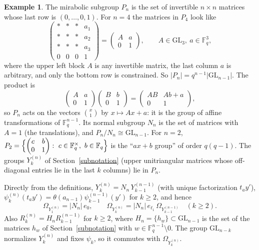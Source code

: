 \documentclass[11pt, letterpaper]{amsart}
\theoremstyle{definition}
\newtheorem{example}{Example}
\theoremstyle{remark}
\newcommand{\FF}{\mathbb{F}}
\newcommand{\GL}{\mathrm{GL}}
\begin{document}
\begin{example}\label{exmirab}
The mirabolic subgroup $P_n$ is the set of invertible $n\times n$ matrices whose last row is $(0,\dots,0,1)$. For $n=4$ the matrices in $P_4$ look like
\[
\left(\begin{array}{ccc|c}
\ast&\ast&\ast&a_1\\
\ast&\ast&\ast&a_2\\
\ast&\ast&\ast&a_3\\\hline
0&0&0&1
\end{array}\right)
=\begin{pmatrix}A&a\\0&1\end{pmatrix},\qquad A\in\GL_3,\ a\in\FF_q^3,
\]
where the upper left block $A$ is any invertible matrix, the last column $a$ is arbitrary, and only the bottom row is constrained. So $|P_n|=q^{n-1}|\GL_{n-1}|$. The product is
\[
\begin{pmatrix}A&a\\0&1\end{pmatrix}\begin{pmatrix}B&b\\0&1\end{pmatrix}=\begin{pmatrix}AB&Ab+a\\0&1\end{pmatrix},
\]
so $P_n$ acts on the vectors $\binom{x}{1}$ by $x\mapsto Ax+a$: it is the group of affine transformations of $\FF_q^{n-1}$. Its normal subgroup $N_n$ is the set of matrices with $A=1$ (the translations), and $P_n/N_n\cong\GL_{n-1}$. For $n=2$,
$P_2=\Bigl\{\begin{pmatrix}c&b\\0&1\end{pmatrix}:\ c\in\FF_q^\times,\ b\in\FF_q\Bigr\}$ is the ``$ax+b$ group'' of order $q(q-1)$. The groups $Y^{(n)}_k$ of Section~\ref{subnotation} (upper unitriangular matrices whose off-diagonal entries lie in the last $k$ columns) lie in $P_n$.
\end{example}

Directly from the definitions, $Y^{(n)}_k=N_n\,Y^{(n-1)}_{k-1}$ (with unique factorization $t_ay'$), $\psi^{(n)}_k(t_ay')=\theta(a_{n-1})\psi^{(n-1)}_{k-1}(y')$ for $k\ge2$, and hence
\[
\Omega_{Y^{(n)}_1}=|N_n|\,e_0,\qquad \Omega_{Y_k^{(n)}}=|N_n|\,e_{\ell_1}\,\Omega_{Y_{k-1}^{(n-1)}}\quad(k\ge2).
\]
Also $R^{(n)}_k=H_nR^{(n-1)}_{k-1}$ for $k\ge2$, where $H_n=\{h_w\}\subset\GL_{n-1}$ is the set of the matrices $h_w$ of Section~\ref{subnotation} with $w\in\FF_q^{n-1}\setminus0$. The group $\GL_{n-k}$ normalizes $Y_k^{(n)}$ and fixes $\psi_k$, so it commutes with $\Omega_{Y^{(n)}_k}$.
\end{document}
